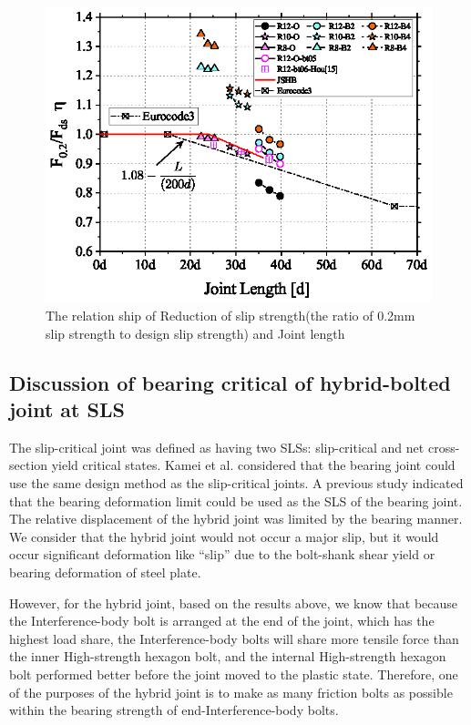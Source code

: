 \begin{figure}[htbp]
    \centering
    \includegraphics[width=0.75\linewidth]{imgs/ch5/F02-Fds-L-eq-new.eps}
    \caption{The relation ship of Reduction of slip strength(the ratio of 0.2mm slip strength to design slip strength) and Joint length}
    \label{fig-fdsredu}
\end{figure}

\subsection{Discussion of bearing critical of hybrid-bolted joint at SLS}

The slip-critical joint was defined as having two SLSs: slip-critical and net cross-section yield critical states. Kamei et al. \cite{kamei2010} considered that the bearing joint could use the same design method as the slip-critical joints. A previous study indicated that the bearing deformation limit could be used \cite{Rex2003,TODA2014} as the SLS of the bearing joint. The relative displacement of the hybrid joint was limited by the bearing manner. We consider that the hybrid joint would not occur a major slip, but it would occur significant deformation like ``slip'' due to the bolt-shank shear yield or bearing deformation of steel plate.

However, for the hybrid joint, based on the results above, we know that because the Interference-body bolt is arranged at the end of the joint, which has the highest load share, the Interference-body bolts will share more tensile force than the inner High-strength hexagon bolt, and the internal High-strength hexagon bolt performed better before the joint moved to the plastic state. Therefore, one of the purposes of the hybrid joint is to make as many friction bolts as possible within the bearing strength of end-Interference-body bolts.

